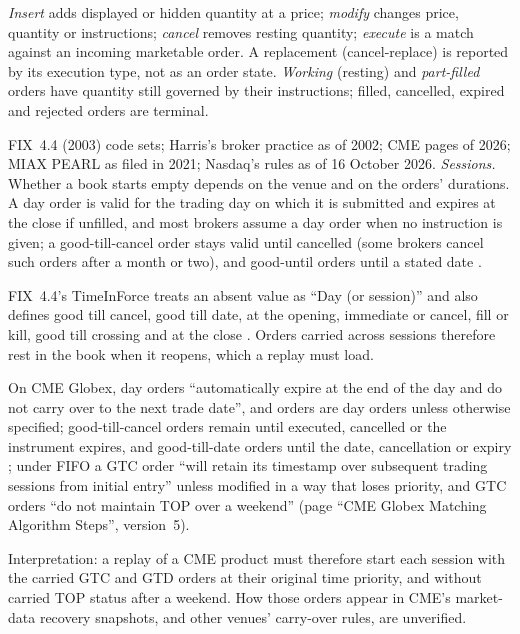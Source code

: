 \begin{qfmechanism}
 \emph{Insert} adds displayed or hidden quantity at a price; \emph{modify} changes price, quantity or instructions; \emph{cancel} removes resting quantity; \emph{execute} is a match against an incoming marketable order. A replacement (cancel-replace) is reported by its execution type, not as an order state. \emph{Working} (resting) and \emph{part-filled} orders have quantity still governed by their instructions; filled, cancelled, expired and rejected orders are terminal.

 FIX~4.4 (2003) code sets; Harris's broker practice as of 2002; CME pages of 2026; MIAX PEARL as filed in 2021; Nasdaq's rules as of 16 October 2026. \emph{Sessions.} Whether a book starts empty depends on the venue and on the orders' durations. A day order is valid for the trading day on which it is submitted and expires at the close if unfilled, and most brokers assume a day order when no instruction is given; a good-till-cancel order stays valid until cancelled (some brokers cancel such orders after a month or two), and good-until orders until a stated date \citep[chap.~4, sec.~4.9, pp.~82--84, Table~4-3]{alpha-harris}.

FIX~4.4's TimeInForce treats an absent value as ``Day (or session)'' and also defines good till cancel, good till date, at the opening, immediate or cancel, fill or kill, good till crossing and at the close \citep[TimeInForce code set]{fix44-orchestra}. Orders carried across sessions therefore rest in the book when it reopens, which a replay must load.

On CME Globex, day orders ``automatically expire at the end of the day and do not carry over to the next trade date'', and orders are day orders unless otherwise specified; good-till-cancel orders remain until executed, cancelled or the instrument expires, and good-till-date orders until the date, cancellation or expiry \citep[page ``Order Qualifiers'', version~3, 11 March 2026]{cme-wiki-2026}; under FIFO a GTC order ``will retain its timestamp over subsequent trading sessions from initial entry'' unless modified in a way that loses priority, and GTC orders ``do not maintain TOP over a weekend'' (page ``CME Globex Matching Algorithm Steps'', version~5).

Interpretation: a replay of a CME product must therefore start each session with the carried GTC and GTD orders at their original time priority, and without carried TOP status after a weekend. How those orders appear in CME's market-data recovery snapshots, and other venues' carry-over rules, are unverified.


\end{qfmechanism}
